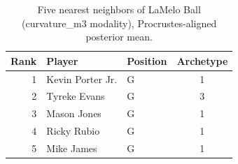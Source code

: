 \begin{table}[htbp]
  \centering\small
  \begin{tabular}{rllc}
    \toprule
    Rank & Player & Position & Archetype \\
    \midrule
    1 & Kevin Porter Jr. & G & 1 \\
    2 & Tyreke Evans & G & 3 \\
    3 & Mason Jones & G & 1 \\
    4 & Ricky Rubio & G & 1 \\
    5 & Mike James & G & 1 \\
    \bottomrule
  \end{tabular}
  \caption{Five nearest neighbors of LaMelo Ball (curvature_m3 modality), Procrustes-aligned posterior mean.}
  \label{tab:LaMelo_Ball_neighbors_curvature_m3}
\end{table}

